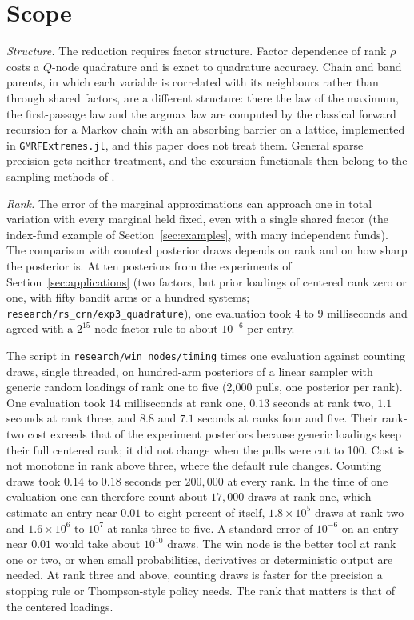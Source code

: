 \documentclass[11pt]{article}
\begin{document}
\section{Scope}
\label{sec:limits}

\emph{Structure.} The reduction requires factor structure. Factor
dependence of rank $\rho$ costs a $Q$-node quadrature and is exact to
quadrature accuracy. Chain and band parents, in which each variable
is correlated with its neighbours rather than through shared factors,
are a different structure: there the law of the maximum, the
first-passage law and the argmax law are computed by the classical
forward recursion for a Markov chain with an absorbing barrier on a
lattice, implemented in \texttt{GMRFExtremes.jl}, and this paper does
not treat them. General sparse precision gets neither treatment, and
the excursion functionals then belong to the sampling methods of
\citet{bolin2015}.

\emph{Rank.} The error of the marginal approximations can approach one
in total variation with every marginal held fixed, even with a single
shared factor (the index-fund example of Section~\ref{sec:examples}, with many
independent funds). The
comparison with counted posterior draws depends on rank and on how
sharp the posterior is. At ten posteriors from the experiments of
Section~\ref{sec:applications} (two factors, but prior loadings of
centered rank zero or one, with fifty bandit arms or a hundred
systems; \texttt{research/rs\_crn/exp3\_quadrature}), one
evaluation took $4$ to $9$ milliseconds and agreed with a
$2^{15}$-node factor rule to about $10^{-6}$ per entry.

The script in \texttt{research/win\_nodes/timing} times
one evaluation against counting draws, single threaded, on
hundred-arm posteriors of a linear sampler with generic random
loadings of rank one to five (2,000 pulls, one posterior per rank).
 One evaluation took $14$
milliseconds at rank one, $0.13$ seconds at rank two, $1.1$ seconds
at rank three, and $8.8$ and $7.1$ seconds at ranks four and five.
Their rank-two cost exceeds that of the experiment posteriors because
generic loadings keep their full centered rank; it did not change
when the pulls were cut to 100. Cost is not monotone in rank above
three, where the default rule changes. Counting draws took $0.14$ to $0.18$ seconds per $200{,}000$ at
every rank. In the time of one evaluation one can therefore count
about $17{,}000$ draws at rank one, which estimate an entry near
$0.01$ to eight percent of itself, $1.8\times10^5$ draws at rank two
and $1.6\times10^6$ to $10^7$ at ranks three to five. A standard
error of $10^{-6}$ on an entry near $0.01$ would take about $10^{10}$
draws. The win node is the better tool at rank one or two, or when
small probabilities, derivatives or deterministic output are needed.
At rank three and above, counting draws is faster for the precision
a stopping rule or Thompson-style policy needs. The rank that matters
is that of the centered loadings.
\end{document}
